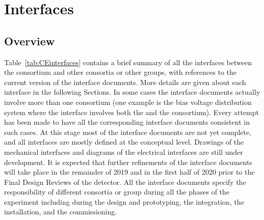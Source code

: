 \section{Interfaces}
\label{sec:fdsp-tpcelec-interfaces}

\subsection{Overview}
\label{sec:fdsp-tpcelec-interfaces-overview}

Table~\ref{tab:CEinterfaces} contains a brief summary of all the interfaces
between the  consortium and other consortia or other groups,
with references to the current version of the interface documents. More
details are given about each interface in the following Sections.
In some cases the interface documents actually involve more than one 
consortium (one example is the bias voltage distribution system where
the interface involves both the  and the  consortium).
Every attempt has been made to have all the corresponding interface documents 
consistent in such cases. At this stage most of the interface documents are
not yet complete, and all interfaces are mostly defined at the conceptual
level. Drawings of the mechanical interfaces and diagrams
of the electrical interfaces are still under development. It is expected 
that further refinements of the interface documents will take place in the
remainder of 2019 and in the first half of 2020 prior to the Final Design
Reviews of the detector. All the interface documents specify the responsibility
of different consortia or group during all the phases of the experiment
including during the design and prototyping, the integration, the installation,
and the commissioning.



